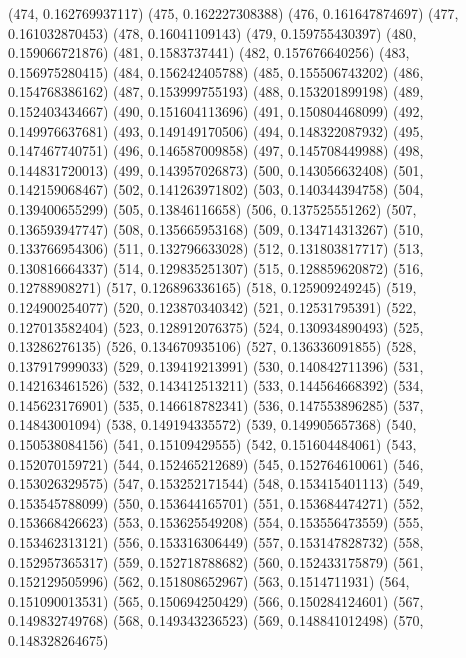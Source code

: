 {					(474, 0.162769937117)
					(475, 0.162227308388)
					(476, 0.161647874697)
					(477, 0.161032870453)
					(478, 0.16041109143)
					(479, 0.159755430397)
					(480, 0.159066721876)
					(481, 0.1583737441)
					(482, 0.157676640256)
					(483, 0.156975280415)
					(484, 0.156242405788)
					(485, 0.155506743202)
					(486, 0.154768386162)
					(487, 0.153999755193)
					(488, 0.153201899198)
					(489, 0.152403434667)
					(490, 0.151604113696)
					(491, 0.150804468099)
					(492, 0.149976637681)
					(493, 0.149149170506)
					(494, 0.148322087932)
					(495, 0.147467740751)
					(496, 0.146587009858)
					(497, 0.145708449988)
					(498, 0.144831720013)
					(499, 0.143957026873)
					(500, 0.143056632408)
					(501, 0.142159068467)
					(502, 0.141263971802)
					(503, 0.140344394758)
					(504, 0.139400655299)
					(505, 0.13846116658)
					(506, 0.137525551262)
					(507, 0.136593947747)
					(508, 0.135665953168)
					(509, 0.134714313267)
					(510, 0.133766954306)
					(511, 0.132796633028)
					(512, 0.131803817717)
					(513, 0.130816664337)
					(514, 0.129835251307)
					(515, 0.128859620872)
					(516, 0.12788908271)
					(517, 0.126896336165)
					(518, 0.125909249245)
					(519, 0.124900254077)
					(520, 0.123870340342)
					(521, 0.12531795391)
					(522, 0.127013582404)
					(523, 0.128912076375)
					(524, 0.130934890493)
					(525, 0.13286276135)
					(526, 0.134670935106)
					(527, 0.136336091855)
					(528, 0.137917999033)
					(529, 0.139419213991)
					(530, 0.140842711396)
					(531, 0.142163461526)
					(532, 0.143412513211)
					(533, 0.144564668392)
					(534, 0.145623176901)
					(535, 0.146618782341)
					(536, 0.147553896285)
					(537, 0.14843001094)
					(538, 0.149194335572)
					(539, 0.149905657368)
					(540, 0.150538084156)
					(541, 0.15109429555)
					(542, 0.151604484061)
					(543, 0.152070159721)
					(544, 0.152465212689)
					(545, 0.152764610061)
					(546, 0.153026329575)
					(547, 0.153252171544)
					(548, 0.153415401113)
					(549, 0.153545788099)
					(550, 0.153644165701)
					(551, 0.153684474271)
					(552, 0.153668426623)
					(553, 0.153625549208)
					(554, 0.153556473559)
					(555, 0.153462313121)
					(556, 0.153316306449)
					(557, 0.153147828732)
					(558, 0.152957365317)
					(559, 0.152718788682)
					(560, 0.152433175879)
					(561, 0.152129505996)
					(562, 0.151808652967)
					(563, 0.1514711931)
					(564, 0.151090013531)
					(565, 0.150694250429)
					(566, 0.150284124601)
					(567, 0.149832749768)
					(568, 0.149343236523)
					(569, 0.148841012498)
					(570, 0.148328264675)
}
